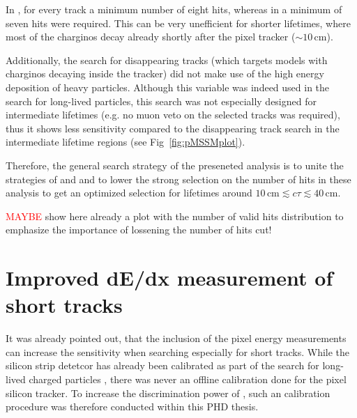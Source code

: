 In \cite{bib:CMS:HSCP_8TeV}, for every track a minimum number of eight hits, whereas in \cite{bib:CMS:DT_8TeV} a minimum of seven hits were required. 
This can be very unefficient for shorter lifetimes, where most of the charginos decay already shortly after the pixel tracker ($\sim 10\,\text{cm}$).

Additionally, the search for disappearing tracks (which targets models with charginos decaying inside the tracker) did not make use of the high energy deposition of heavy particles. 
Although this variable was indeed used in the search for long-lived particles, this search was not especially designed for intermediate lifetimes (e.g. no muon veto on the selected tracks was required), 
thus it shows less sensitivity compared to the disappearing track search in the intermediate lifetime regions (see Fig~\ref{fig:pMSSMplot}).

Therefore, the general search strategy of the preseneted analysis is to unite the strategies of \cite{bib:CMS:HSCP_8TeV} and \cite{bib:CMS:DT_8TeV} and to lower the strong selection on the number of hits in these analysis 
to get an optimized selection for lifetimes around $10\,\text{cm} \lesssim c\tau \lesssim  40\,\text{cm}$.


\textcolor{red}{MAYBE} show here already a plot with the number of valid hits distribution to emphasize the importance of lossening the number of hits cut!
\section{Improved dE/dx measurement of short tracks}
\label{sec:DeDxMeasurement}
It was already pointed out, that the inclusion of the pixel energy measurements can increase the sensitivity when searching especially for short tracks.
While the silicon strip detetcor has already been calibrated as part of the search for long-lived charged particles \cite{bib:CMS:HSCP_8TeV}, there was never an offline calibration done for the pixel silicon tracker.
To increase the discrimination power of \dedx, such an calibration procedure was therefore conducted within this PHD thesis.
 
